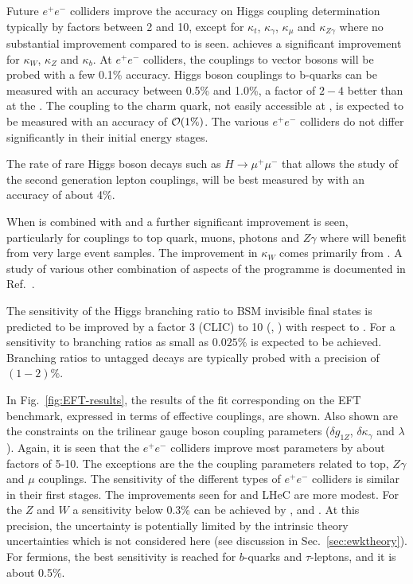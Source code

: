 \documentclass[../report.tex]{subfiles}
\newcommand{\epem}{e^{+}e^{-}}
\begin{document}
Future $e^+e^-$ colliders improve the accuracy on Higgs coupling determination typically by factors between 2 and 10, except for $\kappa_t$, $\kappa_\gamma$, $\kappa_\mu$ and $\kappa_{Z\gamma}$ where no substantial improvement compared to \HLLHC is seen. \LHeC achieves a significant improvement for $\kappa_W$, $\kappa_Z$ and $\kappa_b$.
At $e^+e^-$  colliders, the couplings to vector bosons will be probed with a few 0.1\% accuracy. Higgs boson couplings to b-quarks can be measured with an accuracy between 0.5\% and 1.0\%, a factor of $2-4$ better than at the \HLLHC.  The coupling to the charm quark, not easily accessible at \HLLHC, is expected to be measured with an accuracy of ${\cal O}(1\%)$. The various $e^+e^-$ colliders do not differ significantly in their initial energy stages. 

The rate of rare Higgs boson decays such as $H\to \mu^+\mu^-$ that allows the study of the second generation lepton couplings, will be best measured by \HLLHC with an accuracy of about 4\%. 

When \FCCee is combined with \FCCeh and \FCChh a further significant improvement is seen, particularly for couplings to top quark, muons, photons and $Z\gamma$ where \FCChh will benefit from very large event samples. The improvement in $\kappa_W$ comes primarily from \FCCeh. A study of various other combination of aspects of the \FCC programme is documented in Ref.~\cite{deBlas:2019rxi}. 
 
The sensitivity of the Higgs branching ratio to BSM invisible final states is predicted to be improved by a factor 3 (CLIC) to 10 (\FCCee, \ILC) with respect to \HLLHC. For \FCChh a sensitivity to branching ratios as small as $0.025\%$ is expected to be achieved. Branching ratios to untagged decays are typically probed with a precision of $(1-2)\%$.

In Fig.~\ref{fig:EFT-results}, the results of the fit corresponding on the EFT benchmark, expressed in terms of effective couplings, are shown. Also shown are the constraints on the trilinear gauge boson coupling parameters ($\delta g_{1Z}$, $\delta \kappa_\gamma$ and $\lambda$). Again, it is seen that the $e^+e^-$ colliders improve most parameters by about factors of 5-10. The exceptions are the the coupling parameters related to top, $Z\gamma$ and $\mu$ couplings. The sensitivity of the different types of $\epem$ colliders is similar in their first stages. The improvements seen for \HELHC and LHeC are more modest.
For the $Z$ and $W$ a sensitivity below 0.3\% can be achieved by \ILC, \CLIC and \FCC. At this precision, the uncertainty is potentially limited by the intrinsic theory uncertainties which is not considered here (see discussion in Sec.~\ref{sec:ewktheory}). For fermions, the best sensitivity is reached for $b$-quarks and $\tau$-leptons, and it is about 0.5\%. %
\end{document}
